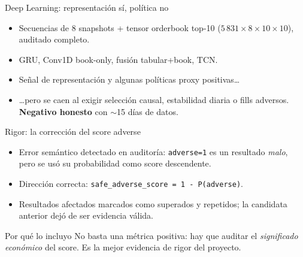 \documentclass[aspectratio=169,11pt]{beamer}
\begin{document}
\begin{frame}{Deep Learning: representación sí, política no}
  \begin{itemize}
    \item Secuencias de 8 snapshots + tensor orderbook top-10
      ($5\,831\times8\times10\times10$), auditado completo.
    \item GRU, Conv1D book-only, fusión tabular+book, TCN.
    \item Señal de representación y algunas políticas proxy positivas\ldots
    \item \ldots pero se caen al exigir selección causal, estabilidad diaria o
      fills adversos. \textbf{Negativo honesto} con $\sim$15 días de datos.
  \end{itemize}
\end{frame}

\begin{frame}{Rigor: la corrección del score adverse}
  \begin{itemize}
    \item Error semántico detectado en auditoría: \texttt{adverse=1} es un
      resultado \emph{malo}, pero se usó su probabilidad como score descendente.
    \item Dirección correcta: \texttt{safe\_adverse\_score = 1 - P(adverse)}.
    \item Resultados afectados marcados como superados y repetidos; la candidata
      anterior dejó de ser evidencia válida.
  \end{itemize}
  \begin{block}{Por qué lo incluyo}
    No basta una métrica positiva: hay que auditar el \emph{significado económico}
    del score. Es la mejor evidencia de rigor del proyecto.
  \end{block}
\end{frame}
\end{document}
